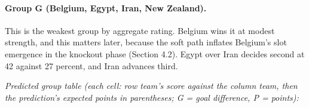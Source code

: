 \documentclass[11pt,letterpaper]{article}
\begin{document}


\paragraph{Group G (Belgium, Egypt, Iran, New Zealand).} This is the weakest group by aggregate rating. Belgium wins it at modest strength, and this matters later, because the soft path inflates Belgium's slot emergence in the knockout phase (Section 4.2). Egypt over Iran decides second at 42 against 27 percent, and Iran advances third.

\noindent\textit{\footnotesize Predicted group table (each cell: row team's score against the column team, then the prediction's expected points in parentheses; G = goal difference, P = points):}
\end{document}
